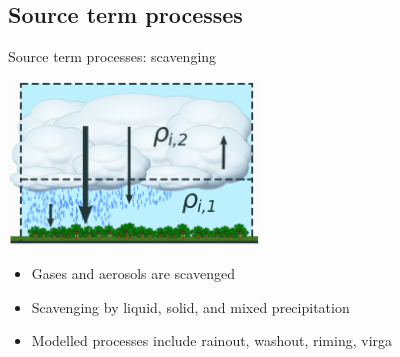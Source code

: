 \documentclass[10pt]{beamer}
\begin{document}
\subsection{Source term processes}
\frame{\sectionpage}

\begin{frame}[fragile]{Source term processes: scavenging}
    \begin{center}
    \includegraphics[width=0.5\textwidth]{box-model-scav.eps}
    \end{center}
    \begin{itemize}
        \item Gases and aerosols are scavenged
        \item Scavenging by liquid, solid, and mixed precipitation
        \item Modelled processes include rainout, washout, riming, virga
    \end{itemize}
\end{frame}
\end{document}
